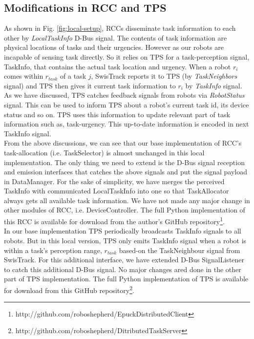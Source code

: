 \subsection*{Modifications in RCC and TPS}
As shown in Fig. \ref{fig:local-setup}, RCCs disseminate task information to each other by \textit{LocalTaskInfo} D-Bus signal. The contents of task information are physical locations of tasks and their urgencies. However as our robots are incapable of sensing task directly. So it relies on TPS for a task-perception signal, TaskInfo, that contains the actual task location and urgency. When a robot $r_i$ comes within $r_{task}$ of a task $j$, SwisTrack reports it to TPS (by {\em TaskNeighbors} signal) and TPS then gives it current task information to $r_i$ by {\em TaskInfo} signal. As we have discussed, TPS catches feedback signals from robots via \textit{RobotStatus} signal. This can be used to inform TPS about a robot's current task id, its device status and so on. TPS uses this information to update relevant part of task information such as, task-urgency. This up-to-date information is encoded in next TaskInfo signal.\\
From the above discussions, we can see that our base implementation of RCC's task-allocation (i.e. TaskSelector) is almost unchanged in this local implementation. The only thing we need to extend is the D-Bus signal reception and emission interfaces that catches the above signals and put the signal payload in DataManager. For the sake of simplicity, we have merges the perceived TaskInfo with communicated LocalTaskInfo into one so that TaskAllocator always gets all available task information. We have not made any major change in other modules of RCC, i.e. DeviceController. The full Python implementation of this RCC is available for download from the author's GitHub repository\footnote{http://github.com/roboshepherd/EpuckDistributedClient }.\\ 
In our base implementation TPS periodically broadcasts TaskInfo signals to all robots. But in this local version, TPS only emits TaskInfo signal when a robot is within a task's perception range, $r_{task}$ based-on the TaskNeighbour signal from SwisTrack. For this additional interface, we have extended D-Bus SignalListener to catch this additional D-Bus signal.  No major changes ared done in the other part of TPS implementation. The full Python implementation of TPS is available for download from this GitHub repository\footnote{http://github.com/roboshepherd/DitributedTaskServer}.
